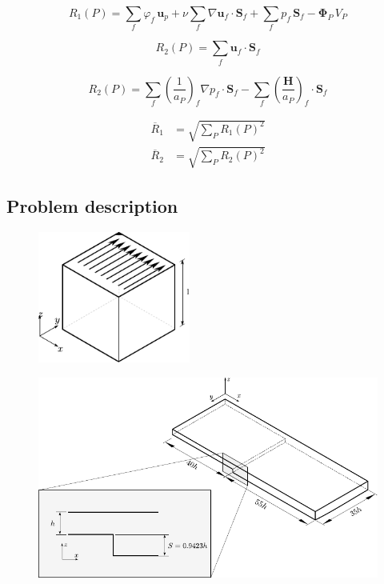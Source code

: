 \documentclass[final,3p,times,10pt,onecolumn]{myElsarticle}
\numberwithin{equation}{section}
\begin{document}
\begin{equation}
R_1(P)
=
\sum_{f}
\varphi_f\,
\boldsymbol{u}_p
+
\nu
\sum_f
\nabla \boldsymbol{u}_f
\cdot
\boldsymbol{S}_f
+
\sum_f
p_f
\,
\boldsymbol{S}_f
-
\boldsymbol{\Phi}_P \, V_P
\end{equation}

\begin{equation}
R_2(P)
=
\sum_f
\boldsymbol{u}_f
\cdot
\boldsymbol{S}_f
\end{equation}

\begin{equation}
R_2(P)
=
\sum_f 
\left(
\frac{1}{a_P}
\right)_f 
\nabla p_f
\cdot
\boldsymbol{S}_f 
-
\sum_f
\left(
\frac{\boldsymbol{H}}
{a_P}
\right)_f 
\cdot 
\boldsymbol{S}_f 
\end{equation}

\begin{align}
\overline{R}_1
&=
\sqrt
{
\sum_P
R_1(P)^2
}
\\
\overline{R}_2
&=
\sqrt
{
\sum_P
R_2(P)^2
}
\end{align}






\subsection{Problem description}

\begin{figure}[H]
\centering
\includegraphics[width=5cm]{fig/Cases/Cavity.pdf}
\caption{}
\label{Fig:Cavity}
\end{figure}  

\begin{figure}[H]
\centering
\includegraphics[width=14cm]{fig/Cases/Geometria3.pdf}
\caption{}
\label{Fig:Geometria3}
\end{figure}  
\end{document}
